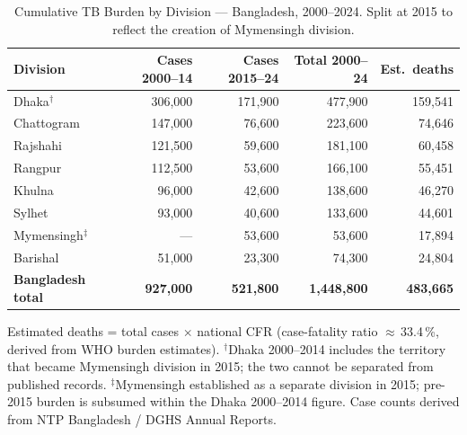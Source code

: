 \begin{table}[htbp]
\centering
\caption{Cumulative TB Burden by Division --- Bangladesh, 2000--2024. Split at 2015 to reflect the creation of Mymensingh division.}
\label{tab:division_cumulative}
\small
\begin{tabular}{lrrrr}
\toprule
\textbf{Division} & \textbf{Cases 2000--14} & \textbf{Cases 2015--24} & \textbf{Total 2000--24} & \textbf{Est.\ deaths} \\
\midrule
Dhaka$^{\dagger}$ & 306,000 & 171,900 & 477,900 & 159,541 \\
Chattogram & 147,000 & 76,600 & 223,600 & 74,646 \\
Rajshahi & 121,500 & 59,600 & 181,100 & 60,458 \\
Rangpur & 112,500 & 53,600 & 166,100 & 55,451 \\
Khulna & 96,000 & 42,600 & 138,600 & 46,270 \\
Sylhet & 93,000 & 40,600 & 133,600 & 44,601 \\
Mymensingh$^{\ddagger}$ & --- & 53,600 & 53,600 & 17,894 \\
Barishal & 51,000 & 23,300 & 74,300 & 24,804 \\
\midrule
\textbf{Bangladesh total} & \textbf{927,000} & \textbf{521,800} & \textbf{1,448,800} & \textbf{483,665} \\
\bottomrule
\end{tabular}
\par\smallskip
\raggedright\footnotesize Estimated deaths = total cases $\times$ national CFR (case-fatality ratio $\approx$\,33.4\,\%, derived from WHO burden estimates). $^{\dagger}$Dhaka 2000--2014 includes the territory that became Mymensingh division in 2015; the two cannot be separated from published records. $^{\ddagger}$Mymensingh established as a separate division in 2015; pre-2015 burden is subsumed within the Dhaka 2000--2014 figure. Case counts derived from NTP Bangladesh / DGHS Annual Reports.
\end{table}